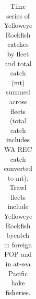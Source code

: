 \documentclass[
  english,
]{article}
\begin{document}
\endgroup

\newpage{}

\begin{landscape}
\begingroup
\fontsize{9.0pt}{11.0pt}\selectfont

\begin{longtable}{>{\raggedleft\arraybackslash}p{\dimexpr 56.25pt -2\tabcolsep-1.5\arrayrulewidth}>{\raggedleft\arraybackslash}p{\dimexpr 56.25pt -2\tabcolsep-1.5\arrayrulewidth}>{\raggedleft\arraybackslash}p{\dimexpr 56.25pt -2\tabcolsep-1.5\arrayrulewidth}>{\raggedleft\arraybackslash}p{\dimexpr 56.25pt -2\tabcolsep-1.5\arrayrulewidth}>{\raggedleft\arraybackslash}p{\dimexpr 56.25pt -2\tabcolsep-1.5\arrayrulewidth}>{\raggedleft\arraybackslash}p{\dimexpr 56.25pt -2\tabcolsep-1.5\arrayrulewidth}>{\raggedleft\arraybackslash}p{\dimexpr 56.25pt -2\tabcolsep-1.5\arrayrulewidth}>{\raggedleft\arraybackslash}p{\dimexpr 56.25pt -2\tabcolsep-1.5\arrayrulewidth}>{\raggedleft\arraybackslash}p{\dimexpr 56.25pt -2\tabcolsep-1.5\arrayrulewidth}}

\caption{\label{tbl-all_removals}Time series of Yelloweye Rockfish
catches by fleet and total catch (mt) summed across fleets (total catch
includes WA REC catch converted to mt). Trawl fleets include Yelloweye
Rockfish bycatch in foreign POP and in at-sea Pacific hake fisheries.}

\tabularnewline


\end{longtable}
\end{landscape}
\end{document}
